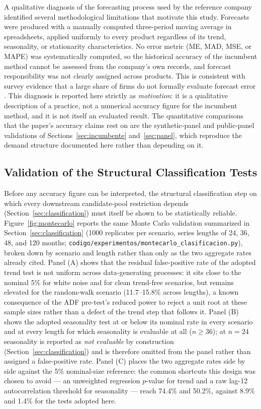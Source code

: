\documentclass[forecasting,article,submit,pdftex,moreauthors]{Definitions/mdpi}
\begin{document}
A qualitative diagnosis of the forecasting process used by the reference company identified several methodological limitations that motivate this study. Forecasts were produced with a manually computed three-period moving average in spreadsheets, applied uniformly to every product regardless of its trend, seasonality, or stationarity characteristics. No error metric (ME, MAD, MSE, or MAPE) was systematically computed, so the historical accuracy of the incumbent method cannot be assessed from the company's own records, and forecast responsibility was not clearly assigned across products. This is consistent with survey evidence that a large share of firms do not formally evaluate forecast error \cite{kerkkanen2009}. This diagnosis is reported here strictly as \emph{motivation}: it is a qualitative description of a practice, not a numerical accuracy figure for the incumbent method, and it is not itself an evaluated result. The quantitative comparisons that the paper's accuracy claims rest on are the synthetic-panel and public-panel validations of Sections~\ref{sec:incumbente} and~\ref{sec:panel}, which reproduce the demand structure documented here rather than depending on it.

\subsection{Validation of the Structural Classification Tests}
\label{sec:mcvalidation}

Before any accuracy figure can be interpreted, the structural classification step on which every downstream candidate-pool restriction depends (Section~\ref{sec:classification}) must itself be shown to be statistically reliable. Figure~\ref{fig:montecarlo} reports the same Monte Carlo validation summarized in Section~\ref{sec:classification} (1000 replicates per scenario, series lengths of 24, 36, 48, and 120 months; \texttt{codigo/\allowbreak experimentos/\allowbreak montecarlo\_\allowbreak clasificacion.py}), broken down by scenario and length rather than only as the two aggregate rates already cited. Panel (A) shows that the residual false-positive rate of the adopted trend test is not uniform across data-generating processes: it sits close to the nominal 5\% for white noise and for clean trend-free scenarios, but remains elevated for the random-walk scenario (11.7--15.8\% across lengths), a known consequence of the ADF pre-test's reduced power to reject a unit root at these sample sizes rather than a defect of the trend step that follows it. Panel (B) shows the adopted seasonality test at or below its nominal rate in every scenario and at every length for which seasonality is evaluable at all ($n\geq 36$); at $n=24$ seasonality is reported as \emph{not evaluable} by construction (Section~\ref{sec:classification}) and is therefore omitted from the panel rather than assigned a false-positive rate. Panel (C) places the two aggregate rates side by side against the 5\% nominal-size reference: the common shortcuts this design was chosen to avoid --- an unweighted regression $p$-value for trend and a raw lag-12 autocorrelation threshold for seasonality --- reach 74.4\% and 50.2\%, against 8.9\% and 1.4\% for the tests adopted here.
\end{document}
